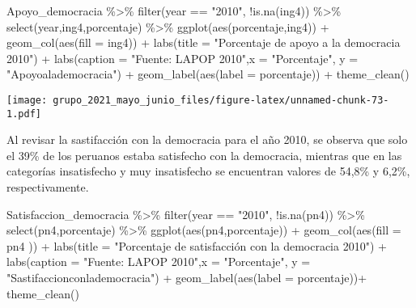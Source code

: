 \documentclass[
]{book}
\newenvironment{Shaded}{\begin{snugshade}}{\end{snugshade}}
\newcommand{\AttributeTok}[1]{\textcolor[rgb]{0.77,0.63,0.00}{#1}}
\newcommand{\FunctionTok}[1]{\textcolor[rgb]{0.00,0.00,0.00}{#1}}
\newcommand{\NormalTok}[1]{#1}
\newcommand{\SpecialCharTok}[1]{\textcolor[rgb]{0.00,0.00,0.00}{#1}}
\newcommand{\StringTok}[1]{\textcolor[rgb]{0.31,0.60,0.02}{#1}}
\begin{document}
\begin{Shaded}
\begin{Highlighting}[]
\NormalTok{Apoyo\_democracia }\SpecialCharTok{\%\textgreater{}\%}
  \FunctionTok{filter}\NormalTok{(year }\SpecialCharTok{==} \StringTok{"2010"}\NormalTok{, }\SpecialCharTok{!}\FunctionTok{is.na}\NormalTok{(ing4)) }\SpecialCharTok{\%\textgreater{}\%}
  \FunctionTok{select}\NormalTok{(year,ing4,porcentaje) }\SpecialCharTok{\%\textgreater{}\%}
  \FunctionTok{ggplot}\NormalTok{(}\FunctionTok{aes}\NormalTok{(porcentaje,ing4)) }\SpecialCharTok{+} 
  \FunctionTok{geom\_col}\NormalTok{(}\FunctionTok{aes}\NormalTok{(}\AttributeTok{fill =}\NormalTok{ ing4)) }\SpecialCharTok{+} 
  \FunctionTok{labs}\NormalTok{(}\AttributeTok{title =} \StringTok{"Porcentaje de apoyo a la democracia 2010"}\NormalTok{) }\SpecialCharTok{+}
  \FunctionTok{labs}\NormalTok{(}\AttributeTok{caption =} \StringTok{"Fuente: LAPOP 2010"}\NormalTok{,}\AttributeTok{x =} \StringTok{"Porcentaje"}\NormalTok{, }\AttributeTok{y =} \StringTok{"Apoyoalademocracia"}\NormalTok{) }\SpecialCharTok{+}
  \FunctionTok{geom\_label}\NormalTok{(}\FunctionTok{aes}\NormalTok{(}\AttributeTok{label =}\NormalTok{ porcentaje)) }\SpecialCharTok{+}
  \FunctionTok{theme\_clean}\NormalTok{()}
\end{Highlighting}
\end{Shaded}

\texttt{[image: grupo\_2021\_mayo\_junio\_files/figure-latex/unnamed-chunk-73-1.pdf]}

Al revisar la sastifacción con la democracia para el año 2010, se observa que solo el 39\% de los peruanos estaba satisfecho con la democracia, mientras que en las categorías insatisfecho y muy insatisfecho se encuentran valores de 54,8\% y 6,2\%, respectivamente.

\begin{Shaded}
\begin{Highlighting}[]
\NormalTok{Satisfaccion\_democracia }\SpecialCharTok{\%\textgreater{}\%}
  \FunctionTok{filter}\NormalTok{(year }\SpecialCharTok{==} \StringTok{"2010"}\NormalTok{, }\SpecialCharTok{!}\FunctionTok{is.na}\NormalTok{(pn4)) }\SpecialCharTok{\%\textgreater{}\%}
  \FunctionTok{select}\NormalTok{(pn4,porcentaje) }\SpecialCharTok{\%\textgreater{}\%}
  \FunctionTok{ggplot}\NormalTok{(}\FunctionTok{aes}\NormalTok{(pn4,porcentaje))  }\SpecialCharTok{+} 
  \FunctionTok{geom\_col}\NormalTok{(}\FunctionTok{aes}\NormalTok{(}\AttributeTok{fill =}\NormalTok{ pn4 )) }\SpecialCharTok{+} 
  \FunctionTok{labs}\NormalTok{(}\AttributeTok{title =} \StringTok{"Porcentaje de satisfacción con la democracia 2010"}\NormalTok{) }\SpecialCharTok{+}
  \FunctionTok{labs}\NormalTok{(}\AttributeTok{caption =} \StringTok{"Fuente: LAPOP 2010"}\NormalTok{,}\AttributeTok{x =} \StringTok{"Porcentaje"}\NormalTok{, }\AttributeTok{y =} \StringTok{"Sastifaccionconlademocracia"}\NormalTok{) }\SpecialCharTok{+}
  \FunctionTok{geom\_label}\NormalTok{(}\FunctionTok{aes}\NormalTok{(}\AttributeTok{label =}\NormalTok{ porcentaje))}\SpecialCharTok{+}
  \FunctionTok{theme\_clean}\NormalTok{()}
\end{Highlighting}
\end{Shaded}
\end{document}
